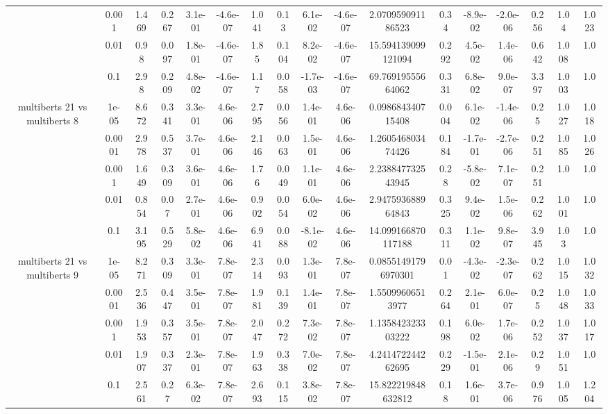 \begin{tabular}{|c|c|c|c|c|c|c|c|c|c|c|c|c|c|c|c|c|}
 & 0.001 & 1.469 & 0.267 & 3.1e-01 & -4.6e-07 & 1.041 & 0.13 & 6.1e-02 & -4.6e-07 & 2.070959091186523 & 0.34 & -8.9e-02 & -2.0e-06 & 0.256 & 1.04 & 1.023 \\
 & 0.01 & 0.98 & 0.097 & 1.8e-01 & -4.6e-07 & 1.85 & 0.104 & 8.2e-02 & -4.6e-07 & 15.594139099121094 & 0.292 & 4.5e-02 & 1.4e-06 & 0.642 & 1.008 & 1.0 \\
 & 0.1 & 2.98 & 0.209 & 4.8e-02 & -4.6e-07 & 1.17 & 0.058 & -1.7e-03 & -4.6e-07 & 69.76919555664062 & 0.331 & 6.8e-02 & 9.0e-07 & 3.397 & 1.003 & 1.0 \\
\hline
\multirow{5}{*}{multiberts 21 vs multiberts 8} & 1e-05 & 8.672 & 0.341 & 3.3e-01 & 4.6e-06 & 2.795 & 0.056 & 1.4e-01 & 4.6e-06 & 0.098684340715408 & 0.004 & 6.1e-02 & -1.4e-06 & 0.25 & 1.027 & 1.018 \\
 & 0.0001 & 2.978 & 0.537 & 3.7e-01 & 4.6e-06 & 2.146 & 0.063 & 1.5e-01 & 4.6e-06 & 1.260546803474426 & 0.184 & -1.7e-01 & -2.7e-06 & 0.251 & 1.085 & 1.026 \\
 & 0.001 & 1.649 & 0.309 & 3.6e-01 & 4.6e-06 & 1.76 & 0.049 & 1.1e-01 & 4.6e-06 & 2.238847732543945 & 0.28 & -5.8e-02 & 7.1e-07 & 0.251 & 1.0 & 1.0 \\
 & 0.01 & 0.854 & 0.07 & 2.7e-01 & 4.6e-06 & 0.902 & 0.054 & 6.0e-02 & 4.6e-06 & 2.947593688964843 & 0.325 & 9.4e-02 & 1.5e-06 & 0.262 & 1.001 & 1.0 \\
 & 0.1 & 3.195 & 0.529 & 5.8e-02 & 4.6e-06 & 6.941 & 0.088 & -8.1e-02 & 4.6e-06 & 14.099166870117188 & 0.311 & 1.1e-02 & 9.8e-07 & 3.945 & 1.03 & 1.0 \\
\hline
\multirow{5}{*}{multiberts 21 vs multiberts 9} & 1e-05 & 8.271 & 0.309 & 3.3e-01 & 7.8e-07 & 2.314 & 0.093 & 1.3e-01 & 7.8e-07 & 0.08551491796970301 & 0.01 & -4.3e-02 & -2.3e-07 & 0.262 & 1.015 & 1.032 \\
 & 0.0001 & 2.536 & 0.447 & 3.5e-01 & 7.8e-07 & 1.981 & 0.139 & 1.4e-01 & 7.8e-07 & 1.55099606513977 & 0.264 & 2.1e-01 & 6.0e-07 & 0.25 & 1.048 & 1.033 \\
 & 0.001 & 1.953 & 0.357 & 3.5e-01 & 7.8e-07 & 2.047 & 0.272 & 7.3e-02 & 7.8e-07 & 1.135842323303222 & 0.198 & 6.0e-02 & 1.7e-06 & 0.252 & 1.037 & 1.017 \\
 & 0.01 & 1.907 & 0.337 & 2.3e-01 & 7.8e-07 & 1.963 & 0.338 & 7.0e-02 & 7.8e-07 & 4.241472244262695 & 0.229 & -1.5e-01 & 2.1e-06 & 0.29 & 1.051 & 1.0 \\
 & 0.1 & 2.561 & 0.27 & 6.3e-02 & 7.8e-07 & 2.693 & 0.115 & 3.8e-02 & 7.8e-07 & 15.822219848632812 & 0.18 & 1.6e-01 & 3.7e-06 & 0.976 & 1.005 & 1.204 \\

\end{tabular}
